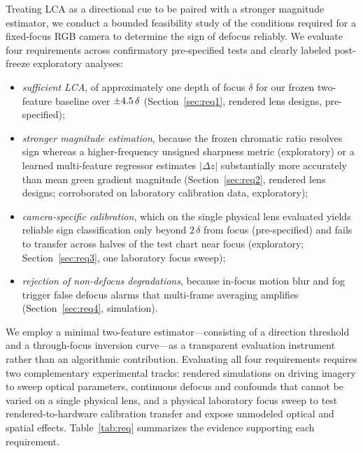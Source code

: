 \documentclass{ieee-ojvt}
\begin{document}
Treating LCA as a directional cue to be paired with a stronger magnitude estimator, we conduct a bounded feasibility study of the conditions required for a fixed-focus RGB camera to determine the sign of defocus reliably. We evaluate four requirements across confirmatory pre-specified tests and clearly labeled post-freeze exploratory analyses:
\begin{itemize}
\item \emph{sufficient LCA}, of approximately one depth of focus $\delta$ for our frozen two-feature baseline over $\pm4.5\,\delta$ (Section~\ref{sec:req1}, rendered lens designs, pre-specified);
\item \emph{stronger magnitude estimation}, because the frozen chromatic ratio resolves sign whereas a higher-frequency unsigned sharpness metric (exploratory) or a learned multi-feature regressor estimates $|\Delta z|$ substantially more accurately than mean green gradient magnitude (Section~\ref{sec:req2}, rendered lens designs; corroborated on laboratory calibration data, exploratory);
\item \emph{camera-specific calibration}, which on the single physical lens evaluated yields reliable sign classification only beyond $2\,\delta$ from focus (pre-specified) and fails to transfer across halves of the test chart near focus (exploratory; Section~\ref{sec:req3}, one laboratory focus sweep);
\item \emph{rejection of non-defocus degradations}, because in-focus motion blur and fog trigger false defocus alarms that multi-frame averaging amplifies (Section~\ref{sec:req4}, simulation).
\end{itemize}
We employ a minimal two-feature estimator---consisting of a direction threshold and a through-focus inversion curve---as a transparent evaluation instrument rather than an algorithmic contribution. Evaluating all four requirements requires two complementary experimental tracks: rendered simulations on driving imagery to sweep optical parameters, continuous defocus and confounds that cannot be varied on a single physical lens, and a physical laboratory focus sweep to test rendered-to-hardware calibration transfer and expose unmodeled optical and spatial effects. Table~\ref{tab:req} summarizes the evidence supporting each requirement.
\end{document}
